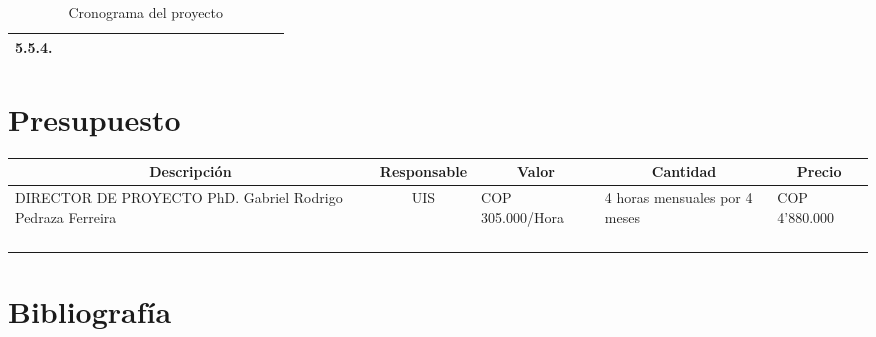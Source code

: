 \documentclass[12pt]{article}
\begin{document}
\begin{table}[H]
{\begin{tabular}{|rllllllllllllllll|}
        \multicolumn{1}{|r|}{5.5.4.} & \multicolumn{1}{l|}{} & \multicolumn{1}{l|}{} & \multicolumn{1}{l|}{} & \multicolumn{1}{l|}{} & \multicolumn{1}{l|}{} & \multicolumn{1}{l|}{} & \multicolumn{1}{l|}{} & \multicolumn{1}{l|}{} & \multicolumn{1}{l|}{} & \multicolumn{1}{l|}{} & \multicolumn{1}{l|}{} & \multicolumn{1}{c|}{\cellcolor[HTML]{B4A7D6}} & \multicolumn{1}{c|}{\cellcolor[HTML]{B4A7D6}} & \multicolumn{1}{c|}{\cellcolor[HTML]{EA9999}} & \multicolumn{1}{c|}{\cellcolor[HTML]{EA9999}} & \multicolumn{1}{c|}{\cellcolor[HTML]{EA9999}} \\ \hline
        \end{tabular}%
        }
        \caption[Tabla]{Cronograma del proyecto}
        \label{tab:cron}
    \end{table}
        
    \pagebreak

    \section{Presupuesto}
    
    \begin{table}[ht]
    \small
            \begin{tabularx}{\textwidth}{|X|c|X|X|X|}
                \hline
                \multicolumn{1}{|c}{\textbf{Descripción}} & \multicolumn{1}{|c}{\textbf{Responsable}} & \multicolumn{1}{|c}{\textbf{Valor}} & \multicolumn{1}{|c}{\textbf{Cantidad}} & \multicolumn{1}{|c|}{\textbf{Precio}} \\ \hline
                DIRECTOR DE PROYECTO PhD. Gabriel Rodrigo Pedraza Ferreira & UIS & COP 305.000/Hora & \multicolumn{1}{X|}{\raggedright 4 horas mensuales por 4 meses} & COP 4'880.000 \\ \hline
        &  &  &  &  \\ \hline
        &  &  &  &  \\ \hline
        &  &  &  &  \\ \hline
        &  &  &  &  \\ \hline
        
        \end{tabularx}{\parfillskip=0pt\par}
    \end{table}
    

    \pagebreak

    \section{Bibliografía}

    \begingroup
    \renewcommand{\section}[2]{}
    \renewcommand{\addcontentsline}[3]{}
    
    \endgroup
\end{document}
